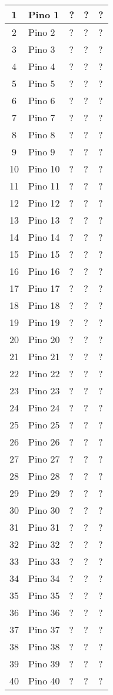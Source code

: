 \begin{table}
\begin{tabular}{ |c | p{3cm}| p{3cm} |p{3cm} | p{3cm} | }
		1  & Pino 1 & ? & ? & ?\\ \hline
		2  & Pino 2 & ? & ? & ? \\ \hline
		3  & Pino 3 & ? & ? & ? \\ \hline
		4  & Pino 4 & ? & ? & ? \\ \hline
		5  & Pino 5 & ? & ? & ? \\ \hline
		6  & Pino 6 & ? & ? & ? \\ \hline
		7  & Pino 7 & ? & ? & ? \\ \hline
		8  & Pino 8 & ? & ? & ? \\ \hline
		9  & Pino 9 & ? & ? & ? \\ \hline
		10 & Pino 10 & ? & ? & ? \\ \hline
		11 & Pino 11 & ? & ? & ? \\ \hline
		12 & Pino 12 & ? & ? & ? \\ \hline
		13 & Pino 13 & ? & ? & ? \\ \hline	
		14 & Pino 14 & ? & ? & ?\\ \hline
		15 & Pino 15 & ? & ? & ? \\ \hline
		16 & Pino 16 & ? & ? & ? \\ \hline
		17 & Pino 17 & ? & ? & ? \\ \hline
		18 & Pino 18 & ? & ? & ? \\ \hline
		19 & Pino 19 & ? & ? & ? \\ \hline
		20 & Pino 20 & ? & ? & ? \\ \hline
		21 & Pino 21 & ? & ? & ? \\ \hline
		22 & Pino 22 & ? & ? & ? \\ \hline
		23 & Pino 23 & ? & ? & ? \\ \hline
		24 & Pino 24 & ? & ? & ? \\ \hline
		25 & Pino 25 & ? & ? & ? \\ \hline
		26 & Pino 26 & ? & ? & ? \\ \hline		
		27 & Pino 27 & ? & ? & ?\\ \hline
		28 & Pino 28 & ? & ? & ? \\ \hline
		29 & Pino 29 & ? & ? & ? \\ \hline
		30 & Pino 30 & ? & ? & ? \\ \hline
		31 & Pino 31 & ? & ? & ? \\ \hline
		32 & Pino 32 & ? & ? & ? \\ \hline
		33 & Pino 33 & ? & ? & ? \\ \hline
		34 & Pino 34 & ? & ? & ? \\ \hline
		35 & Pino 35 & ? & ? & ? \\ \hline
		36 & Pino 36 & ? & ? & ? \\ \hline
		37 & Pino 37 & ? & ? & ? \\ \hline
		38 & Pino 38 & ? & ? & ? \\ \hline
		39 & Pino 39 & ? & ? & ? \\ \hline		
		40 & Pino 40 & ? & ? & ?\\ \hline
		
	\end{tabular}					
	
\end{table}

